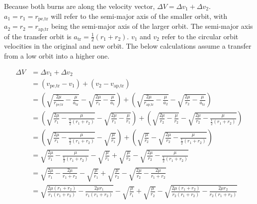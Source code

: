 \documentclass{article}
\begin{document}
Because both burns are along the velocity vector, $\Delta V=\Delta v_1+\Delta v_2$. $a_1=r_1=r_\text{pe,tr}$ will refer to the semi-major axis of the smaller orbit, with $a_2=r_2=r_\text{ap,tr}$ being the semi-major axis of the larger orbit. The semi-major axis of the transfer orbit is $a_\text{tr}=\frac{1}{2}(r_1+r_2)$. $v_1$ and $v_2$ refer to the circular orbit velocities in the original and new orbit. The below calculations assume a transfer from a low orbit into a higher one.

\begin{align*}
    \Delta V & = \Delta v_1+\Delta v_2                                                                                                                                                                                                           \\
             & = (v_\text{pe,tr}-v_1)+(v_2-v_\text{ap,tr})                                                                                                                                                                                       \\
             & = \left(\sqrt{\frac{2\mu}{r_\text{pe,tr}}-\frac{\mu}{a_\text{tr}}}-\sqrt{\frac{2\mu}{r_1}-\frac{\mu}{a_1}}\right)+\left(\sqrt{\frac{2\mu}{r_\text{ap,tr}}-\frac{\mu}{a_2}}-\sqrt{\frac{2\mu}{r_2}-\frac{\mu}{a_\text{tr}}}\right) \\
             & = \left(\sqrt{\frac{2\mu}{r_1}-\frac{\mu}{\frac{1}{2}(r_1+r_2)}}-\sqrt{\frac{2\mu}{r_1}-\frac{\mu}{r_1}}\right)+\left(\sqrt{\frac{2\mu}{r_2}-\frac{\mu}{r_2}}-\sqrt{\frac{2\mu}{r_2}-\frac{\mu}{\frac{1}{2}(r_1+r_2)}}\right)     \\
             & = \left(\sqrt{\frac{2\mu}{r_1}-\frac{\mu}{\frac{1}{2}(r_1+r_2)}}-\sqrt{\frac{\mu}{r_1}}\right)+\left(\sqrt{\frac{\mu}{r_2}}-\sqrt{\frac{2\mu}{r_2}-\frac{\mu}{\frac{1}{2}(r_1+r_2)}}\right)                                       \\
             & = \sqrt{\frac{2\mu}{r_1}-\frac{\mu}{\frac{1}{2}(r_1+r_2)}}-\sqrt{\frac{\mu}{r_1}}+\sqrt{\frac{\mu}{r_2}}-\sqrt{\frac{2\mu}{r_2}-\frac{\mu}{\frac{1}{2}(r_1+r_2)}}                                                                 \\
             & = \sqrt{\frac{2\mu}{r_1}-\frac{2\mu}{r_1+r_2}}-\sqrt{\frac{\mu}{r_1}}+\sqrt{\frac{\mu}{r_2}}-\sqrt{\frac{2\mu}{r_2}-\frac{2\mu}{r_1+r_2}}                                                                                         \\
             & = \sqrt{\frac{2\mu(r_1+r_2)}{r_1(r_1+r_2)}-\frac{2\mu{}r_1}{r_1(r_1+r_2)}}-\sqrt{\frac{\mu}{r_1}}+\sqrt{\frac{\mu}{r_2}}-\sqrt{\frac{2\mu(r_1+r_2)}{r_2(r_1+r_2)}-\frac{2\mu{}r_2}{r_2(r_1+r_2)}}                                 \\

\end{align*}
\end{document}
